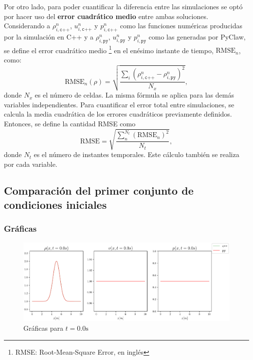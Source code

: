 Por otro lado, para poder cuantificar la diferencia entre las simulaciones se optó por hacer uso del \textbf{error cuadrático medio} entre ambas soluciones. Considerando a $\rho_{i,\texttt{c++}}^{n}$, $u_{i,\texttt{c++}}^{n}$ y $p_{i,\texttt{c++}}^{n}$ como las funciones numéricas producidas por la simulación en C++ y a $\rho_{i,\texttt{py}}^{n}$, $u_{i,\texttt{py}}^{n}$ y $p_{i,\texttt{py}}^{n}$ como las generadas por PyClaw, se define el error cuadrático medio \footnote{RMSE: Root-Mean-Square Error, en inglés} en el enésimo instante de tiempo, $\text{RMSE}_n$, como:
\begin{equation}
	\text{RMSE}_n(\rho) = \sqrt{\frac{\sum_{i}(\rho_{i,\texttt{c++}}^{n} - \rho_{i,\texttt{py}}^{n})^{2}}{N_x}},
\end{equation}
donde $N_x$ es el número de celdas. La misma fórmula se aplica para las demás variables independientes. Para cuantificar el error total entre simulaciones, se calcula la media cuadrática de los errores cuadráticos previamente definidos. Entonces, se define la cantidad RMSE como
\begin{equation}
	\text{RMSE} = \sqrt{\frac{\sum_{n}^{N_{t}} (\text{RMSE}_{n})^{2}}{N_t}},
\end{equation}
donde $N_t$ es el número de instantes temporales. Este cálculo también se realiza por cada variable.
\subsection{Comparación del primer conjunto de condiciones iniciales}
\subsubsection{Gráficas}
\begin{figure}[ht]
	\centering
	\includegraphics[width=1.1\linewidth]{../euler1D/plots_en_TDG/py_sin_claw/py_gauss199/1.pdf}
	\caption{Gráficas para $t=0.0\unit{\s}$}
\end{figure}

